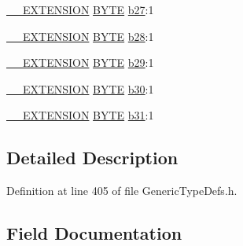 \begin{DoxyCompactItemize}
\item 
\hyperlink{_generic_type_defs_8h_a6f634b0fdcc4febac630fc28e2685ddb}{\+\_\+\+\_\+\+E\+X\+T\+E\+N\+S\+I\+O\+N} \hyperlink{_generic_type_defs_8h_a4ae1dab0fb4b072a66584546209e7d58}{B\+Y\+T\+E} \hyperlink{struct_d_w_o_r_d___v_a_l_1_1_____p_a_c_k_e_d_a443af52ede82463ed8353091aaedaf89}{b27}\+:1
\item 
\hyperlink{_generic_type_defs_8h_a6f634b0fdcc4febac630fc28e2685ddb}{\+\_\+\+\_\+\+E\+X\+T\+E\+N\+S\+I\+O\+N} \hyperlink{_generic_type_defs_8h_a4ae1dab0fb4b072a66584546209e7d58}{B\+Y\+T\+E} \hyperlink{struct_d_w_o_r_d___v_a_l_1_1_____p_a_c_k_e_d_a4502c4b7a7ea96a178a1a2b58f2a44f9}{b28}\+:1
\item 
\hyperlink{_generic_type_defs_8h_a6f634b0fdcc4febac630fc28e2685ddb}{\+\_\+\+\_\+\+E\+X\+T\+E\+N\+S\+I\+O\+N} \hyperlink{_generic_type_defs_8h_a4ae1dab0fb4b072a66584546209e7d58}{B\+Y\+T\+E} \hyperlink{struct_d_w_o_r_d___v_a_l_1_1_____p_a_c_k_e_d_ac53c6581ddf670fc89abacbe1a3321d7}{b29}\+:1
\item 
\hyperlink{_generic_type_defs_8h_a6f634b0fdcc4febac630fc28e2685ddb}{\+\_\+\+\_\+\+E\+X\+T\+E\+N\+S\+I\+O\+N} \hyperlink{_generic_type_defs_8h_a4ae1dab0fb4b072a66584546209e7d58}{B\+Y\+T\+E} \hyperlink{struct_d_w_o_r_d___v_a_l_1_1_____p_a_c_k_e_d_acae3aed5c76c00c301ed783912bf441f}{b30}\+:1
\item 
\hyperlink{_generic_type_defs_8h_a6f634b0fdcc4febac630fc28e2685ddb}{\+\_\+\+\_\+\+E\+X\+T\+E\+N\+S\+I\+O\+N} \hyperlink{_generic_type_defs_8h_a4ae1dab0fb4b072a66584546209e7d58}{B\+Y\+T\+E} \hyperlink{struct_d_w_o_r_d___v_a_l_1_1_____p_a_c_k_e_d_a46f3c2d3866700798b2bdc2309acf2bf}{b31}\+:1
\end{DoxyCompactItemize}


\subsection{Detailed Description}


Definition at line 405 of file Generic\+Type\+Defs.\+h.



\subsection{Field Documentation}
\hypertarget{struct_d_w_o_r_d___v_a_l_1_1_____p_a_c_k_e_d_a4010350907c88306a36c21694097c1ca}{}
